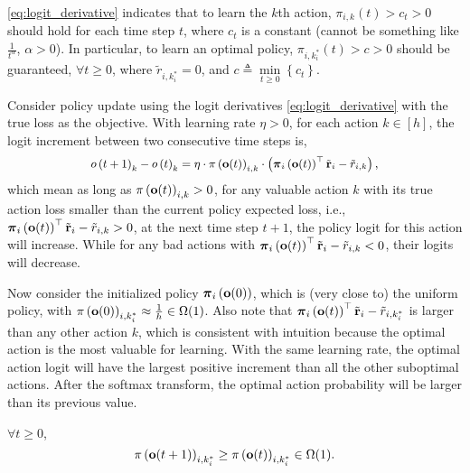 \cref{eq:logit_derivative} indicates that to learn the $k$th action, $\pi_{i,k}(t) > c_t > 0$ should hold for each time step $t$, where $c_t$ is a constant (cannot be something like $\frac{1}{t^\alpha}$, $\alpha> 0$). In particular, to learn an optimal policy, $\pi_{i,k_i^*}(t) > c > 0$ should be guaranteed, $\forall t \ge 0$, where $\tilde{r}_{i,k_i^*} = 0$, and $c \triangleq \min\limits_{t \ge 0}{\left\{  c_t \right\}}$.

Consider policy update using the logit derivatives \cref{eq:logit_derivative} with the true loss as the objective. With learning rate $\eta > 0$, for each action $k \in [h]$, the logit increment between two consecutive time steps is,
\begin{equation*}
\label{eq:logit_increment_logit_space}
\begin{split}
\small
    o\left( t+1 \right)_{k} - o\left( t \right)_{k} = \eta \cdot \pi\left( \rvo(t)\right)_{i,k} \cdot \left( \rvpi_i\left( \rvo(t) \right)^\top \rvtilder_i - \tilde{r}_{i,k} \right),
\end{split}
\end{equation*}
which mean as long as $\pi\left( {\mathbf{o}}(t)\right)_{i,k} > 0$, for any valuable action $k$ with its true action loss smaller than the current policy expected loss, i.e., ${\boldsymbol{\pi}}_i\left( {\mathbf{o}}(t) \right)^\top {\tilde{\mathbf{r}}}_i - \tilde{r}_{i,k} > 0$, at the next time step $t+1$, the policy logit for this action will increase. While for any bad actions with ${\boldsymbol{\pi}}_i\left( {\mathbf{o}}(t) \right)^\top {\tilde{\mathbf{r}}}_i - \tilde{r}_{i,k} < 0$, their logits will decrease.

Now consider the initialized policy ${\boldsymbol{\pi}}_i\left( {\mathbf{o}}(0) \right)$, which is (very close to) the uniform policy, with $\pi\left( {\mathbf{o}}(0)\right)_{i,k_i^*} \approx \frac{1}{h} \in \Omega(1)$. Also note that ${\boldsymbol{\pi}}_i\left( {\mathbf{o}}(t) \right)^\top {\tilde{\mathbf{r}}}_i - \tilde{r}_{i,k_i^*}$ is larger than any other action $k$, which is consistent with intuition because the optimal action is the most valuable for learning. With the same learning rate, the optimal action logit will have the largest positive increment than all the other suboptimal actions. After the softmax transform, the optimal action probability will be larger than its previous value. 
\begin{lem}
\label{lem:optimal_probability_increse_logit_space}
$\forall t \ge 0$,
\begin{equation*}
    \pi\left( {\mathbf{o}}(t+1)\right)_{i,k_i^*} \ge \pi\left( {\mathbf{o}}(t)\right)_{i,k_i^*} \in \Omega(1).
\end{equation*}
\end{lem}

